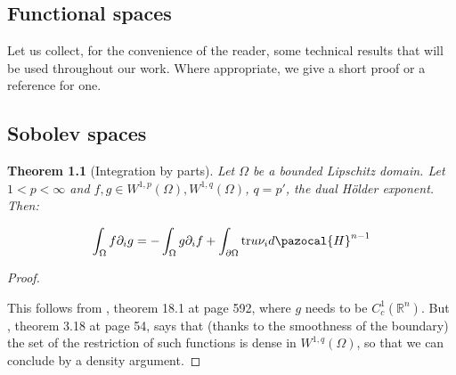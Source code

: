 \documentclass[english,a4paper,9pt,oneside]{scrbook}	%
\theoremstyle{break}
\newtheorem{thm}[equation]{Theorem}
\newenvironment{mproof}[1][\proofname]{%
  \begin{proof}[#1]$ $\par\nobreak\ignorespaces
}{%
  \end{proof}
}
\renewcommand*{\proofname}{Proof}
\theoremstyle{remark}
\newcommand{\mR}{\mathbb{R}}
\newcommand{\tr}{\text{tr}}
\begin{document}
\begin{appendices}

\appendix

\chapter{Functional spaces}
\label{chap:functional_spaces}
Let us collect, for the convenience of the reader, some technical results that will be used throughout our work. Where appropriate, we give a short proof or a reference for one.

\section{Sobolev spaces}

\begin{thm}[Integration by parts]
\label{thm:ibp}
Let $\Omega$ be a bounded Lipschitz domain. Let $1<p<\infty$ and $f,g \in W^{1,p}(\Omega), W^{1,q}(\Omega)$, $q=p'$, the dual Hölder exponent. Then:

$$\int_\Omega f \partial_i g = -\int_\Omega g \partial_i f+\int_{\partial \Omega} \tr u \nu_i d\pazocal{H}^{n-1}$$
\end{thm}
\begin{mproof}

This follows from \cite{leoni}, theorem 18.1 at page 592, where $g$ needs to be $C^1_c(\mR^n)$. But \cite{adams}, theorem 3.18 at page 54, says that (thanks to the smoothness of the boundary) the set of the restriction of such functions is dense in $W^{1,q}(\Omega)$, so that we can conclude by a density argument.
\end{mproof}


\end{appendices}
\end{document}
